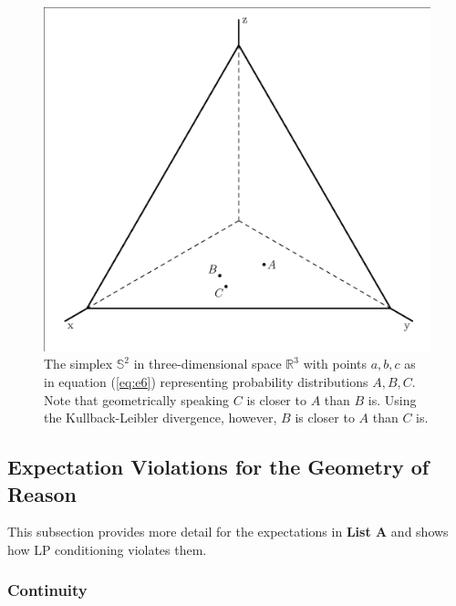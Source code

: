 \documentclass[12pt]{article}
\begin{document}
\begin{figure}[H]
  \begin{flushright}
    \begin{minipage}[h]{.7\linewidth}
      \includegraphics[width=\textwidth]{threepoints.eps}
      \caption{\footnotesize The simplex $\mathbb{S}^{2}$ in
        three-dimensional space $\mathbb{R}^{3}$ with points $a,b,c$
        as in equation (\ref{eq:e6}) representing probability
        distributions $A,B,C$. Note that geometrically speaking $C$ is
        closer to $A$ than $B$ is. Using the Kullback-Leibler
        divergence, however, $B$ is closer to $A$ than $C$ is.}
      \label{fig:threepoints}
    \end{minipage}
  \end{flushright}
\end{figure}

\subsection{Expectation Violations for the Geometry of Reason}
\label{subsec:zoocaesh}

This subsection provides more detail for the expectations in \textbf{List
  A} and shows how LP conditioning violates them.

\subsubsection{Continuity}
\label{Continuity}
\end{document}
